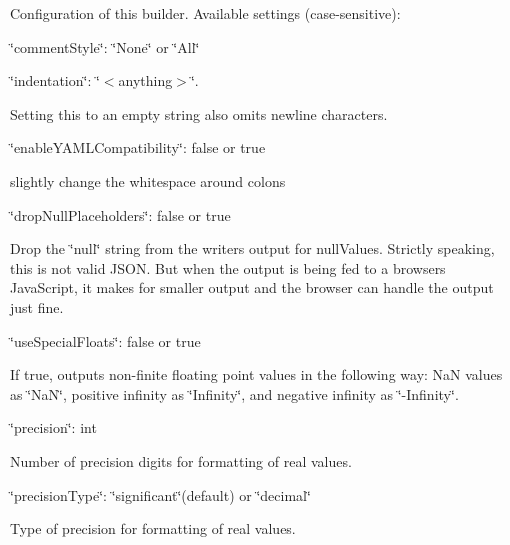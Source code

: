 Configuration of this builder. Available settings (case-\/sensitive)\+:
\begin{DoxyItemize}
\item \char`\"{}comment\+Style\char`\"{}\+: \char`\"{}\+None\char`\"{} or \char`\"{}\+All\char`\"{}
\item \char`\"{}indentation\char`\"{}\+: \char`\"{}$<$anything$>$\char`\"{}.
\begin{DoxyItemize}
\item Setting this to an empty string also omits newline characters.
\end{DoxyItemize}
\item \char`\"{}enable\+Y\+A\+M\+L\+Compatibility\char`\"{}\+: false or true
\begin{DoxyItemize}
\item slightly change the whitespace around colons
\end{DoxyItemize}
\item \char`\"{}drop\+Null\+Placeholders\char`\"{}\+: false or true
\begin{DoxyItemize}
\item Drop the \char`\"{}null\char`\"{} string from the writer\textquotesingle{}s output for null\+Values. Strictly speaking, this is not valid J\+S\+ON. But when the output is being fed to a browser\textquotesingle{}s Java\+Script, it makes for smaller output and the browser can handle the output just fine.
\end{DoxyItemize}
\item \char`\"{}use\+Special\+Floats\char`\"{}\+: false or true
\begin{DoxyItemize}
\item If true, outputs non-\/finite floating point values in the following way\+: NaN values as \char`\"{}\+Na\+N\char`\"{}, positive infinity as \char`\"{}\+Infinity\char`\"{}, and negative infinity as \char`\"{}-\/\+Infinity\char`\"{}.
\end{DoxyItemize}
\item \char`\"{}precision\char`\"{}\+: int
\begin{DoxyItemize}
\item Number of precision digits for formatting of real values.
\end{DoxyItemize}
\item \char`\"{}precision\+Type\char`\"{}\+: \char`\"{}significant\char`\"{}(default) or \char`\"{}decimal\char`\"{}
\begin{DoxyItemize}
\item Type of precision for formatting of real values.
\end{DoxyItemize}
\end{DoxyItemize}

